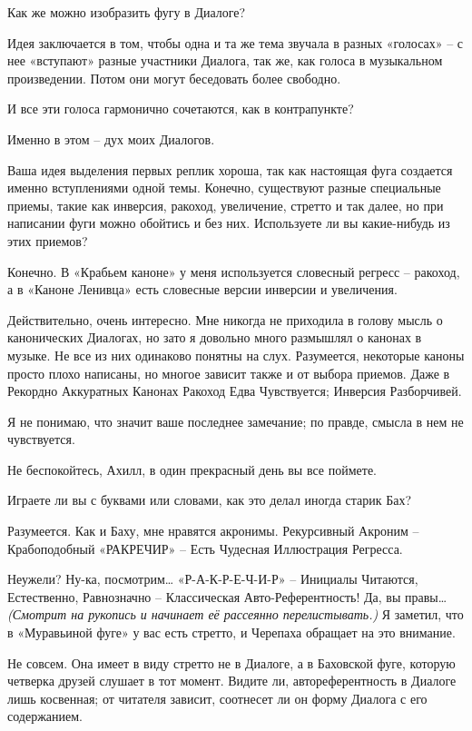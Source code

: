 \documentclass[../main.tex]{subfiles}
\begin{document}
\begin{dialogue}
 Как же можно изобразить фугу в Диалоге?

 Идея заключается в том, чтобы одна и та же тема звучала в разных «голосах» \--- с нее «вступают» разные участники Диалога, так же, как голоса в музыкальном произведении. Потом они могут беседовать более свободно.

 И все эти голоса гармонично сочетаются, как в контрапункте?

 Именно в этом \--- дух моих Диалогов.

 Ваша идея выделения первых реплик хороша, так как настоящая фуга создается именно вступлениями одной темы. Конечно, существуют разные специальные приемы, такие как инверсия, ракоход, увеличение, стретто и так далее, но при написании фуги можно обойтись и без них. Используете ли вы какие-нибудь из этих приемов?

 Конечно. В «Крабьем каноне» у меня используется словесный регресс \--- ракоход, а в «Каноне Ленивца» есть словесные версии инверсии и увеличения.

 Действительно, очень интересно. Мне никогда не приходила в голову мысль о канонических Диалогах, но зато я довольно много размышлял о канонах в музыке. Не все из них одинаково понятны на слух. Разумеется, некоторые каноны просто плохо написаны, но многое зависит также и от выбора приемов. Даже в Рекордно Аккуратных Канонах Ракоход Едва Чувствуется; Инверсия Разборчивей.

 Я не понимаю, что значит ваше последнее замечание; по правде, смысла в нем не чувствуется.

 Не беспокойтесь, Ахилл, в один прекрасный день вы все поймете.

 Играете ли вы с буквами или словами, как это делал иногда старик Бах?

 Разумеется. Как и Баху, мне нравятся акронимы. Рекурсивный Акроним \--- Крабоподобный «РАКРЕЧИР» \--- Есть Чудесная Иллюстрация Регресса.

 Неужели? Ну-ка, посмотрим\ldots{} «Р-А-К-Р-Е-Ч-И-Р» \--- Инициалы Читаются, Естественно, Равнозначно \--- Классическая Авто-Референтность! Да, вы правы\ldots{} \emph{(Смотрит на рукопись и начинает её рассеянно перелистывать.)} Я заметил, что в «Муравьиной фуге» у вас есть стретто, и Черепаха обращает на это внимание.

 Не совсем. Она имеет в виду стретто не в Диалоге, а в Баховской фуге, которую четверка друзей слушает в тот момент. Видите ли, автореферентность в Диалоге лишь косвенная; от читателя зависит, соотнесет ли он форму Диалога с его содержанием.


\end{dialogue}
\end{document}
